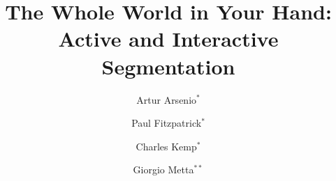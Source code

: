 \documentclass[letter]{epirob}
\begin{document}


\title{The Whole World in Your Hand:\\
Active and Interactive Segmentation}






\author{Artur Arsenio$^{*}$ \and Paul Fitzpatrick$^{*}$ \and Charles Kemp$^{*}$ \and Giorgio Metta$^{**}$}



\maketitle






















\end{document}
